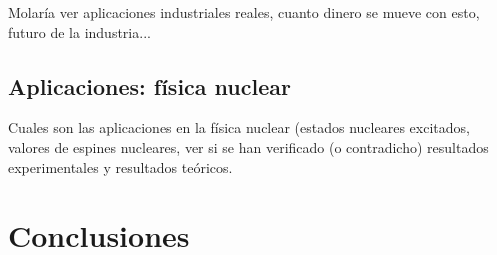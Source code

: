 \documentclass[fleqn,10pt]{SelfArx} %
\begin{document}
Molaría ver aplicaciones industriales reales, cuanto dinero se mueve con esto, futuro de la industria...

\subsection{Aplicaciones: física nuclear}

Cuales son las aplicaciones en la física nuclear (estados nucleares excitados, valores de espines nucleares, ver si se han verificado (o contradicho) resultados experimentales y resultados teóricos. 


\section{Conclusiones}










\newpage
{}



\end{document}
